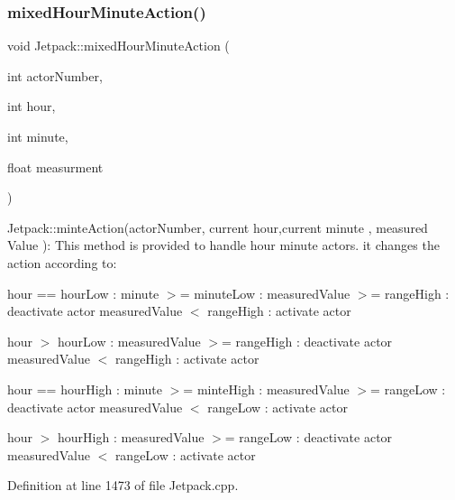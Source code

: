 \subsubsection{\texorpdfstring{mixed\+Hour\+Minute\+Action()}{mixedHourMinuteAction()}}
{\footnotesize\ttfamily void Jetpack\+::mixed\+Hour\+Minute\+Action (\begin{DoxyParamCaption}\item[{int}]{actor\+Number,  }\item[{int}]{hour,  }\item[{int}]{minute,  }\item[{float}]{measurment }\end{DoxyParamCaption})}

Jetpack\+::minte\+Action(actor\+Number, current hour,current minute , measured Value )\+: This method is provided to handle hour minute actors. it changes the action according to\+:

hour == hour\+Low \+: minute $>$= minute\+Low \+: measured\+Value $>$= range\+High \+: deactivate actor measured\+Value $<$ range\+High \+: activate actor

hour $>$ hour\+Low \+: measured\+Value $>$= range\+High \+: deactivate actor measured\+Value $<$ range\+High \+: activate actor

hour == hour\+High \+: minute $>$= minte\+High \+: measured\+Value $>$= range\+Low \+: deactivate actor measured\+Value $<$ range\+Low \+: activate actor

hour $>$ hour\+High \+: measured\+Value $>$= range\+Low \+: deactivate actor measured\+Value $<$ range\+Low \+: activate actor 

Definition at line 1473 of file Jetpack.\+cpp.


